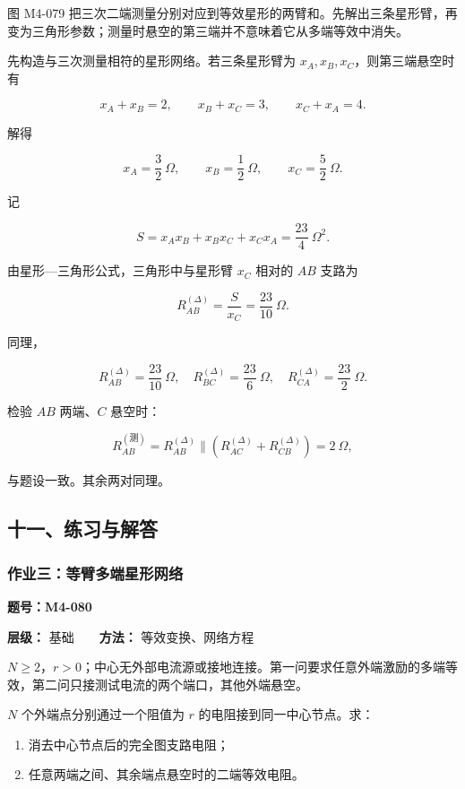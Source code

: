 图 M4-079
把三次二端测量分别对应到等效星形的两臂和。先解出三条星形臂，再变为三角形参数；测量时悬空的第三端并不意味着它从多端等效中消失。

先构造与三次测量相符的星形网络。若三条星形臂为
\(x_A,x_B,x_C\)，则第三端悬空时有

\[
x_A+x_B=2,
\qquad
x_B+x_C=3,
\qquad
x_C+x_A=4.
\]

解得

\[
x_A=\frac32\ \Omega,
\qquad
x_B=\frac12\ \Omega,
\qquad
x_C=\frac52\ \Omega.
\]

记

\[
S=x_Ax_B+x_Bx_C+x_Cx_A
=\frac{23}{4}\ \Omega^2.
\]

由星形---三角形公式，三角形中与星形臂 \(x_C\) 相对的 \(AB\) 支路为

\[
R_{AB}^{(\Delta)}=\frac{S}{x_C}=\frac{23}{10}\ \Omega.
\]

同理，

\[
\boxed{
R_{AB}^{(\Delta)}=\frac{23}{10}\ \Omega,
\quad
R_{BC}^{(\Delta)}=\frac{23}{6}\ \Omega,
\quad
R_{CA}^{(\Delta)}=\frac{23}{2}\ \Omega
}.
\]

检验 \(AB\) 两端、\(C\) 悬空时：

\[
R_{AB}^{(\mathrm{\text{测}})}
=R_{AB}^{(\Delta)}\parallel
\left(R_{AC}^{(\Delta)}+R_{CB}^{(\Delta)}\right)
=2\ \Omega,
\]

与题设一致。其余两对同理。

\subsection{十一、练习与解答}\label{m4:ux5341ux4e00ux7ec3ux4e60ux4e0eux89e3ux7b54-1}

\par{}
\noindent\begin{minipage}{\linewidth}

\subsubsection{作业三：等臂多端星形网络}\label{m4:ux4f5cux4e1aux4e09ux7b49ux81c2ux591aux7aefux661fux5f62ux7f51ux7edc}

\textbf{题号：M4-080}

\textbf{层级：} 基础　　\textbf{方法：} 等效变换、网络方程

\(N\ge2\)，\(r>0\)；中心无外部电流源或接地连接。第一问要求任意外端激励的多端等效，第二问只接测试电流的两个端口，其他外端悬空。

\(N\) 个外端点分别通过一个阻值为 \(r\) 的电阻接到同一中心节点。求：

\begin{enumerate}
\def\labelenumi{\arabic{enumi}.}
\tightlist
\item
  消去中心节点后的完全图支路电阻；
\item
  任意两端之间、其余端点悬空时的二端等效电阻。
\end{enumerate}

\end{minipage}\par


